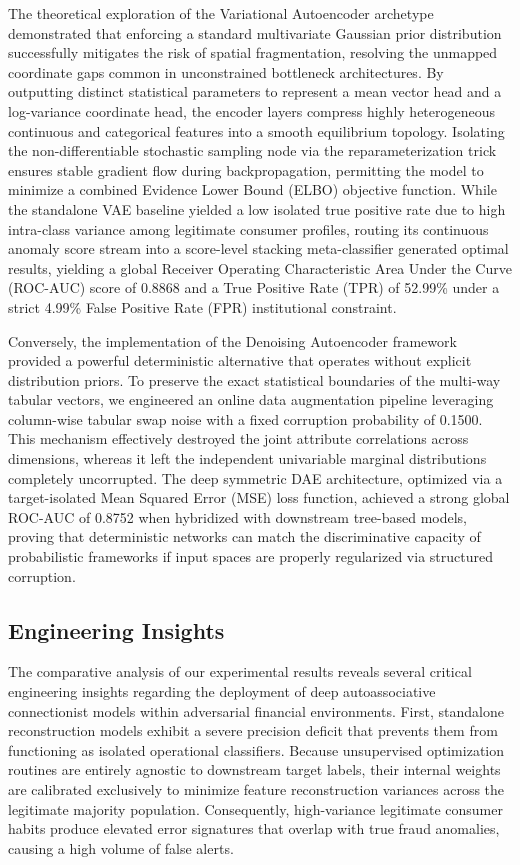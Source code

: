 \documentclass[11pt,a4paper]{report}
\begin{document}
The theoretical exploration of the Variational Autoencoder archetype demonstrated that enforcing a standard multivariate Gaussian prior distribution successfully mitigates the risk of spatial fragmentation, resolving the unmapped coordinate gaps common in unconstrained bottleneck architectures. By outputting distinct statistical parameters to represent a mean vector head and a log-variance coordinate head, the encoder layers compress highly heterogeneous continuous and categorical features into a smooth equilibrium topology. Isolating the non-differentiable stochastic sampling node via the reparameterization trick ensures stable gradient flow during backpropagation, permitting the model to minimize a combined Evidence Lower Bound (ELBO) objective function. While the standalone VAE baseline yielded a low isolated true positive rate due to high intra-class variance among legitimate consumer profiles, routing its continuous anomaly score stream into a score-level stacking meta-classifier generated optimal results, yielding a global Receiver Operating Characteristic Area Under the Curve (ROC-AUC) score of 0.8868 and a True Positive Rate (TPR) of 52.99\% under a strict 4.99\% False Positive Rate (FPR) institutional constraint. 

Conversely, the implementation of the Denoising Autoencoder framework provided a powerful deterministic alternative that operates without explicit distribution priors. To preserve the exact statistical boundaries of the multi-way tabular vectors, we engineered an online data augmentation pipeline leveraging column-wise tabular swap noise with a fixed corruption probability of 0.1500. This mechanism effectively destroyed the joint attribute correlations across dimensions, whereas it left the independent univariable marginal distributions completely uncorrupted. The deep symmetric DAE architecture, optimized via a target-isolated Mean Squared Error (MSE) loss function, achieved a strong global ROC-AUC of 0.8752 when hybridized with downstream tree-based models, proving that deterministic networks can match the discriminative capacity of probabilistic frameworks if input spaces are properly regularized via structured corruption.

\subsection{Engineering Insights}
The comparative analysis of our experimental results reveals several critical engineering insights regarding the deployment of deep autoassociative connectionist models within adversarial financial environments. First, standalone reconstruction models exhibit a severe precision deficit that prevents them from functioning as isolated operational classifiers. Because unsupervised optimization routines are entirely agnostic to downstream target labels, their internal weights are calibrated exclusively to minimize feature reconstruction variances across the legitimate majority population. Consequently, high-variance legitimate consumer habits produce elevated error signatures that overlap with true fraud anomalies, causing a high volume of false alerts. 
\end{document}
